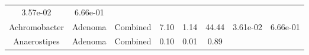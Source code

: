 \documentclass[12pt,]{article}
\begin{document}
\begin{longtable}[]{@{}cccccccc@{}}
\begin{minipage}[t]{0.06\columnwidth}
3.57e-02\strut
\end{minipage} & \begin{minipage}[t]{0.06\columnwidth}\centering\strut
6.66e-01\strut
\end{minipage}\tabularnewline
\begin{minipage}[t]{0.18\columnwidth}\centering\strut
Achromobacter\strut
\end{minipage} & \begin{minipage}[t]{0.07\columnwidth}\centering\strut
Adenoma\strut
\end{minipage} & \begin{minipage}[t]{0.09\columnwidth}\centering\strut
Combined\strut
\end{minipage} & \begin{minipage}[t]{0.03\columnwidth}\centering\strut
7.10\strut
\end{minipage} & \begin{minipage}[t]{0.14\columnwidth}\centering\strut
1.14\strut
\end{minipage} & \begin{minipage}[t]{0.14\columnwidth}\centering\strut
44.44\strut
\end{minipage} & \begin{minipage}[t]{0.06\columnwidth}\centering\strut
3.61e-02\strut
\end{minipage} & \begin{minipage}[t]{0.06\columnwidth}\centering\strut
6.66e-01\strut
\end{minipage}\tabularnewline
\begin{minipage}[t]{0.18\columnwidth}\centering\strut
Anaerostipes\strut
\end{minipage} & \begin{minipage}[t]{0.07\columnwidth}\centering\strut
Adenoma\strut
\end{minipage} & \begin{minipage}[t]{0.09\columnwidth}\centering\strut
Combined\strut
\end{minipage} & \begin{minipage}[t]{0.03\columnwidth}\centering\strut
0.10\strut
\end{minipage} & \begin{minipage}[t]{0.14\columnwidth}\centering\strut
0.01\strut
\end{minipage} & \begin{minipage}[t]{0.14\columnwidth}\centering\strut
0.89\strut
\end{minipage} & \begin{minipage}[t]{0.06\columnwidth}\centering\strut

\end{minipage}
\end{longtable}
\end{document}

